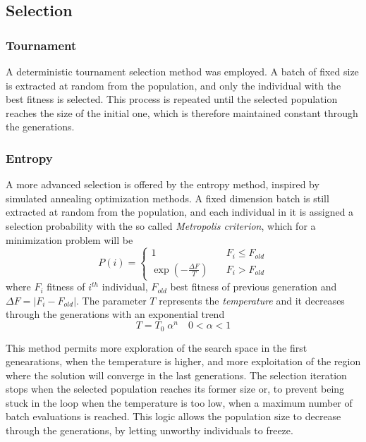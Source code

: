 \documentclass[twocolumn]{article}
\begin{document}
\subsection{Selection}
\subsubsection{Tournament}
A deterministic tournament selection method was employed. A batch of fixed size is extracted at random from the population, and only the individual with the best fitness is selected. This process is repeated until the selected population reaches the size of the initial one, which is therefore maintained constant through the generations.
\subsubsection{Entropy}
A more advanced selection is offered by the entropy method, inspired by simulated annealing optimization methods. A fixed dimension batch is still extracted at random from the population, and each individual in it is assigned a selection probability with the so called \textit{Metropolis criterion}, which for a minimization problem will be 
\begin{equation}
  \label{eq:Metropolis}
  P(i) = \begin{cases}
    1 \quad& F_i \leq F_{old}\\
    \exp\left(- \frac{\Delta F}{T}\right) \quad & F_i > F_{old}
  \end{cases}
\end{equation}
where $F_i$ fitness of $i^{th}$ individual, $F_{old}$ best fitness of previous generation and $\Delta F = |F_i - F_{old}|$. The parameter $T$ represents the \textit{temperature} and it decreases through the generations with an exponential trend
\begin{equation}
  T = T_0\; \alpha ^ n \quad 0 < \alpha < 1
  \label{eq:Temperature}
\end{equation}

This method permits more exploration of the search space in the first genearations, when the temperature is higher, and more exploitation of the region where the solution will converge in the last generations. The selection iteration stops when the selected population reaches its former size or, to prevent being stuck in the loop when the temperature is too low, when a maximum number of batch evaluations is reached. This logic allows the population size to decrease through the generations, by letting unworthy individuals to freeze.
\end{document}
